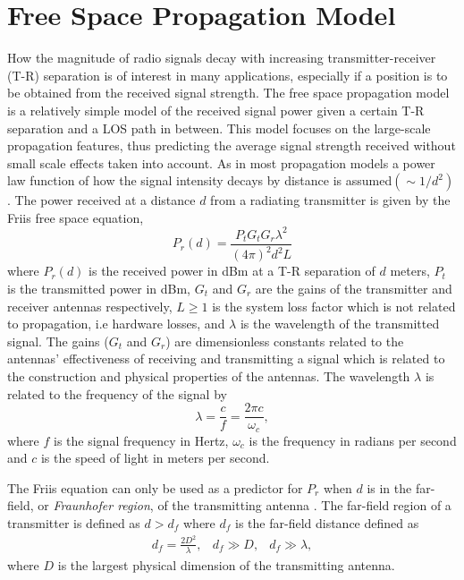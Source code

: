 \documentclass{LTHthesis}
\begin{document}
\section{Free Space Propagation Model}
%
How the magnitude of radio signals decay with increasing transmitter-receiver (T-R) separation is of interest in many applications, especially if a position is to be obtained from the received signal strength. The free space propagation model is a relatively simple model of the received signal power given a certain T-R separation and a LOS path in between. This model focuses on the large-scale propagation features, thus predicting the average signal strength received without small scale effects taken into account. As in most propagation models a power law function of how the signal intensity decays by distance is assumed$\left(\sim{1/d^2}\right)$ \cite{rappaport96}. The power received at a distance $d$ from a radiating transmitter is given by the Friis free space equation,
%
\begin{equation}
P_r(d)=\frac{P_tG_tG_r\lambda^2}{(4\pi)^2d^2L}\label{equation:friis_equation}
\end{equation}
%
where $P_r(d)$ is the received power in dBm at a T-R separation of $d$ meters, $P_t$ is the transmitted power in dBm, $G_t$ and $G_r$ are the gains of the transmitter and receiver antennas respectively, $L\geq1$ is the system loss factor which is not related to propagation, i.e hardware losses, and $\lambda$ is the wavelength of the transmitted signal. The gains ($G_t$ and $G_r$) are dimensionless constants related to the antennas' effectiveness of receiving and transmitting a signal which is related to the construction and physical properties of the antennas. The wavelength $\lambda$ is related to the frequency of the signal by
\begin{equation}
\lambda=\frac{c}{f}=\frac{2\pi c}{\omega_c},
\end{equation} 
%
where $f$ is the signal frequency in Hertz, $\omega_c$ is the frequency in radians per second and $c$ is the speed of light in meters per second. 

The Friis equation can only be used as a predictor for $P_r$ when $d$ is in the far-field, or \emph{Fraunhofer region}, of the transmitting antenna \cite{rappaport96}. The far-field region of a transmitter is defined as $d>d_f$ where $d_f$ is the far-field distance defined as
%
\begin{eqnarray}
d_f=\frac{2D^2}{\lambda}, & d_f\gg D, & d_f\gg \lambda, \label{equation:frau_dist}
\end{eqnarray}
%
where $D$ is the largest physical dimension of the transmitting antenna.
\end{document}
